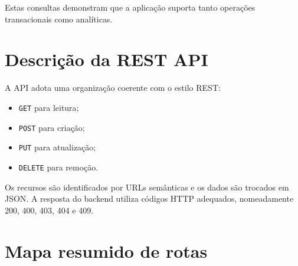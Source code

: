 \documentclass[10pt,a4paper]{report}
\begin{document}
Estas consultas demonstram que a aplicação suporta tanto operações transacionais como analíticas.

\section{Descrição da REST API}

A \ac{API} adota uma organização coerente com o estilo \ac{REST}:

\begin{itemize}
    \item \texttt{GET} para leitura;
    \item \texttt{POST} para criação;
    \item \texttt{PUT} para atualização;
    \item \texttt{DELETE} para remoção.
\end{itemize}

Os recursos são identificados por \ac{URL}s semânticas e os dados são trocados em \ac{JSON}. A resposta do backend utiliza códigos \ac{HTTP} adequados, nomeadamente 200, 400, 403, 404 e 409.

\section{Mapa resumido de rotas}
\end{document}
